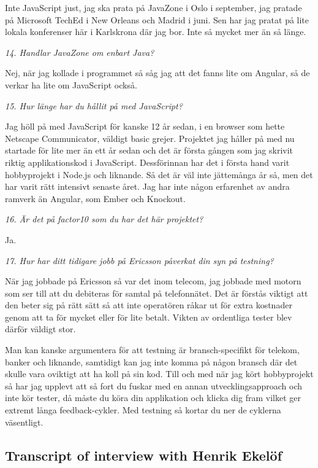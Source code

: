 \documentclass[11pt]{article}
\begin{document}
Inte JavaScript just, jag ska prata på JavaZone i Oslo i september, jag pratade på Microsoft TechEd i New Orleans och Madrid i juni. Sen har jag pratat på lite lokala konferenser här i Karlskrona där jag bor. Inte så mycket mer än så länge.

\emph{14. Handlar JavaZone om enbart Java?}

Nej, när jag kollade i programmet så såg jag att det fanns lite om Angular, så de verkar ha lite om JavaScript också.

\emph{15. Hur länge har du hållit på med JavaScript?}

Jag höll på med JavaScript för kanske 12 år sedan, i en browser som hette Netscape Communicator, väldigt basic grejer. Projektet jag håller på med nu startade för lite mer än ett år sedan och det är första gången som jag skrivit riktig applikationskod i JavaScript. Dessförinnan har det i första hand varit hobbyprojekt i Node.js och liknande. Så det är väl inte jättemånga år så, men det har varit rätt intensivt senaste året. Jag har inte någon erfarenhet av andra ramverk än Angular, som Ember och Knockout.

\emph{16. Är det på factor10 som du har det här projektet?}

Ja.

\emph{17. Hur har ditt tidigare jobb på Ericsson påverkat din syn på testning?}

När jag jobbade på Ericsson så var det inom telecom, jag jobbade med motorn som ser till att du debiteras för samtal på telefonnätet. Det är förstås viktigt att den beter sig på rätt sätt så att inte operatören råkar ut för extra kostnader genom att ta för mycket eller för lite betalt. Vikten av ordentliga tester blev därför väldigt stor.

Man kan kanske argumentera för att testning är bransch-specifikt för telekom, banker och liknande, samtidigt kan jag inte komma på någon bransch där det skulle vara oviktigt att ha koll på sin kod. Till och med när jag kört hobbyprojekt så har jag upplevt att så fort du fuskar med en annan utvecklingsapproach och inte kör tester, då måste du köra din applikation och klicka dig fram vilket ger extremt långa feedback-cykler. Med testning så kortar du ner de cyklerna väsentligt.


\subsection{Transcript of interview with Henrik Ekelöf}
\end{document}

